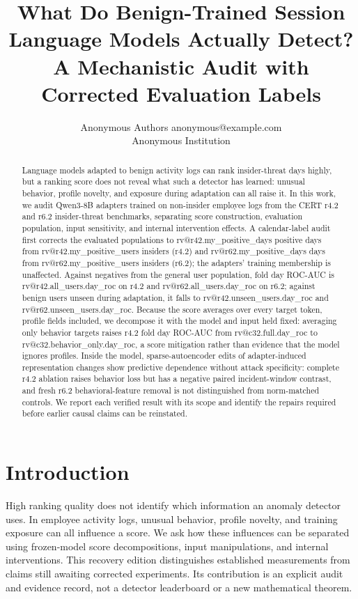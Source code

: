 \documentclass[10pt]{article}
\title{What Do Benign-Trained Session Language Models Actually Detect?\\A Mechanistic Audit with Corrected Evaluation Labels}
\author{\name Anonymous Authors \email anonymous@example.com\\\addr Anonymous Institution}
\makeatletter
\newcommand{\rv}[1]{\csname rv@#1\endcsname}
\makeatother
\begin{document}
\maketitle
\begin{abstract}
Language models adapted to benign activity logs can rank insider-threat days
highly, but a ranking score does not reveal what such a detector has learned:
unusual behavior, profile novelty, and exposure during adaptation can all raise
it. In this work, we audit Qwen3-8B adapters trained on non-insider employee
logs from the CERT r4.2 and r6.2 insider-threat benchmarks, separating score
construction, evaluation population, input sensitivity, and internal
intervention effects. A calendar-label audit first corrects the evaluated
populations to \rv{r42.my_positive_days} positive days from
\rv{r42.my_positive_users} insiders (r4.2) and \rv{r62.my_positive_days} days
from \rv{r62.my_positive_users} insiders (r6.2); the adapters' training
membership is unaffected. Against negatives from the general user population,
fold day ROC-AUC is \rv{r42.all_users.day_roc} on r4.2 and
\rv{r62.all_users.day_roc} on r6.2; against benign users unseen during
adaptation, it falls to \rv{r42.unseen_users.day_roc} and
\rv{r62.unseen_users.day_roc}. Because the score averages over every target
token, profile fields included, we decompose it with the model and input held
fixed: averaging only behavior targets raises r4.2 fold day ROC-AUC from
\rv{c32.full.day_roc} to \rv{c32.behavior_only.day_roc}, a score mitigation
rather than evidence that the model ignores profiles. Inside the model,
sparse-autoencoder edits of adapter-induced representation changes show
predictive dependence without attack specificity: complete r4.2 ablation
raises behavior loss but has a negative paired incident-window contrast, and
fresh r6.2 behavioral-feature removal is not distinguished from norm-matched
controls. We report each verified result with its scope and identify the
repairs required before earlier causal claims can be reinstated.
\end{abstract}
\section{Introduction}
High ranking quality does not identify which information an anomaly detector
uses. In employee activity logs, unusual behavior, profile novelty, and training
exposure can all influence a score. We ask how these influences can be separated
using frozen-model score decompositions, input manipulations, and internal
interventions. This recovery edition distinguishes established measurements
from claims still awaiting corrected experiments. Its contribution is an
explicit audit and evidence record, not a detector leaderboard or a new
mathematical theorem.







\appendix



\end{document}
